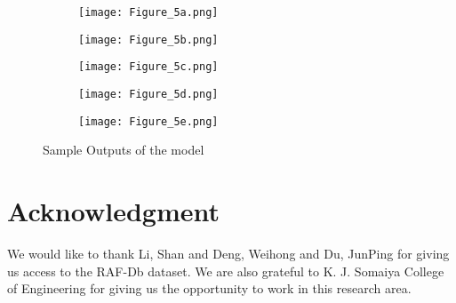 \documentclass[letterpaper,10pt]{article}
\begin{document}
\begin{figure}
     \centering
     \begin{subfigure}[b]{0.15\textwidth}
         \centering
         \texttt{[image: Figure\_5a.png]}
         
         
     \end{subfigure}
     \begin{subfigure}[b]{0.15\textwidth}
         \centering
         \texttt{[image: Figure\_5b.png]}
         
   
     \end{subfigure}
     \begin{subfigure}[b]{0.15\textwidth}
         \centering
         \texttt{[image: Figure\_5c.png]}
         
         
     \end{subfigure}
     \begin{subfigure}[b]{0.15\textwidth}
         \centering
         \texttt{[image: Figure\_5d.png]}

     \end{subfigure}
     \begin{subfigure}[b]{0.15\textwidth}
         \centering
         \texttt{[image: Figure\_5e.png]}
         
     \end{subfigure}
        \caption{Sample Outputs of the model}


       
\end{figure}




\section*{Acknowledgment}
We would like to thank Li, Shan and Deng, Weihong and Du, JunPing for giving us access to the RAF-Db dataset. We are also grateful to K. J. Somaiya College of Engineering for giving us the opportunity to work in this research area.
\end{document}
